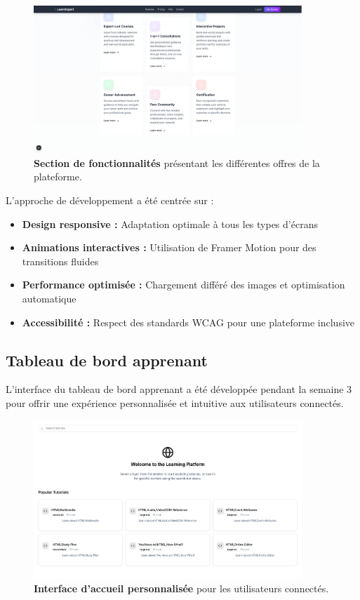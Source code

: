 \begin{figure}[h!]
  \centering
  \includegraphics[width=0.9\textwidth,keepaspectratio]{week_2_img/fetchersection_2.png}
  \caption{\textbf{Section de fonctionnalités} présentant les différentes offres de la plateforme.}
  \label{fig:features_section}
\end{figure}

L'approche de développement a été centrée sur :
\begin{itemize}
  \item \textbf{Design responsive :} Adaptation optimale à tous les types d'écrans
  \item \textbf{Animations interactives :} Utilisation de Framer Motion pour des transitions fluides
  \item \textbf{Performance optimisée :} Chargement différé des images et optimisation automatique
  \item \textbf{Accessibilité :} Respect des standards WCAG pour une plateforme inclusive
\end{itemize}

\subsection{Tableau de bord apprenant}

L'interface du tableau de bord apprenant a été développée pendant la semaine 3 pour offrir une expérience personnalisée et intuitive aux utilisateurs connectés.

\begin{figure}[h!]
  \centering
  \includegraphics[width=0.9\textwidth,keepaspectratio]{week_3_img/accueil.png}
  \caption{\textbf{Interface d'accueil personnalisée} pour les utilisateurs connectés.}
  \label{fig:dashboard}
\end{figure}

